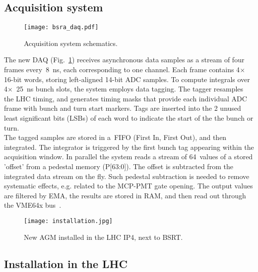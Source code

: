 \subsection{Acquisition system}
\begin{figure}[!tbh]
    \centering
    \texttt{[image: bsra\_daq.pdf]}
    \caption{Acquisition system schematics.}
    \label{fig:bsra_daq}
\end{figure}
%
The new DAQ (Fig.~\ref{fig:bsra_daq}) receives asynchronous data samples as a stream of four frames every~\SI{8}{\nano s}, each corresponding to one channel.
%
Each frame contains 4$\times$16-bit words, storing left-aligned 14-bit ADC samples. 
%
To compute integrals over 4$\times$~\SI{25}{\nano\second} bunch slots, the system employs data tagging. 
%
The tagger resamples the LHC timing, and generates timing masks that  provide each individual ADC frame with %
bunch and turn start markers. 
%
Tags are inserted into the  2 unused least significant bits (LSBs) of each word to indicate the start of the  the bunch or turn.
\\
%
The tagged samples are stored in a~FIFO (First In, First Out), and then integrated. 
%
The integrator is triggered %
by the first bunch tag appearing within the acquisition window.
%
In parallel the system reads a stream of 64~values of a stored 'offset' from a pedestal memory (P[63:0]).
%
The offset is subtracted  from the integrated data stream on the fly.
%
Such pedestal subtraction is needed to remove systematic effects, e.g. related to the  MCP-PMT gate opening. 
%
The output values are filtered by EMA, the results are stored  in RAM, and then read out through the VME64x bus~\cite{my_thesis}.

\begin{figure}[!tbh]
    \centering
    \texttt{[image: installation.jpg]}
    \caption{New AGM installed in the LHC IP4, next to BSRT.}
    \label{fig:installation}
\end{figure}

\subsection{Installation in the LHC}

